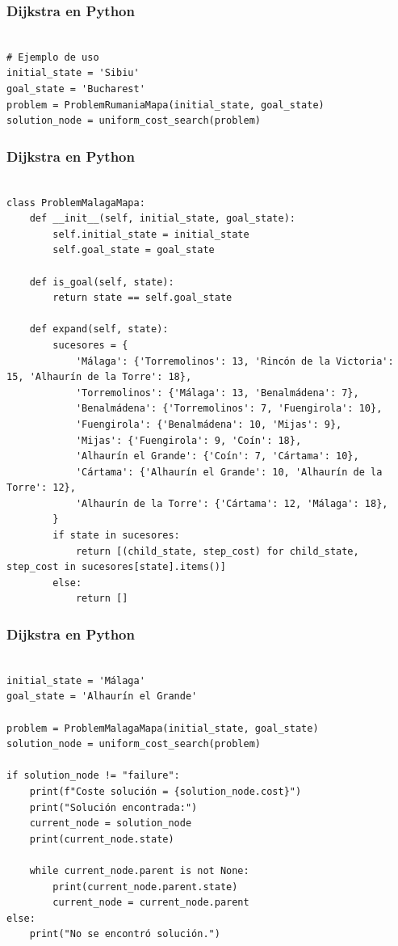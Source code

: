 \documentclass[xcolor=table]{beamer}
\begin{document}
\begin{frame} [fragile ]\frametitle{Dijkstra  en Python } \footnotesize
\begin{verbatim}

# Ejemplo de uso
initial_state = 'Sibiu'
goal_state = 'Bucharest'
problem = ProblemRumaniaMapa(initial_state, goal_state)
solution_node = uniform_cost_search(problem)

\end{verbatim}

\end{frame} 


\begin{frame} [fragile ]\frametitle{Dijkstra  en Python } \footnotesize
\begin{verbatim}

class ProblemMalagaMapa:
    def __init__(self, initial_state, goal_state):
        self.initial_state = initial_state
        self.goal_state = goal_state

    def is_goal(self, state):
        return state == self.goal_state

    def expand(self, state):
        sucesores = {
            'Málaga': {'Torremolinos': 13, 'Rincón de la Victoria': 15, 'Alhaurín de la Torre': 18},
            'Torremolinos': {'Málaga': 13, 'Benalmádena': 7},
            'Benalmádena': {'Torremolinos': 7, 'Fuengirola': 10},
            'Fuengirola': {'Benalmádena': 10, 'Mijas': 9},
            'Mijas': {'Fuengirola': 9, 'Coín': 18},
            'Alhaurín el Grande': {'Coín': 7, 'Cártama': 10},
            'Cártama': {'Alhaurín el Grande': 10, 'Alhaurín de la Torre': 12},
            'Alhaurín de la Torre': {'Cártama': 12, 'Málaga': 18},
        }
        if state in sucesores:
            return [(child_state, step_cost) for child_state, step_cost in sucesores[state].items()]
        else:
            return []
\end{verbatim}

\end{frame} 

\begin{frame} [fragile ]\frametitle{Dijkstra  en Python } \footnotesize
\begin{verbatim}

initial_state = 'Málaga'
goal_state = 'Alhaurín el Grande'

problem = ProblemMalagaMapa(initial_state, goal_state)
solution_node = uniform_cost_search(problem)

if solution_node != "failure":
    print(f"Coste solución = {solution_node.cost}")    
    print("Solución encontrada:")
    current_node = solution_node
    print(current_node.state)
    
    while current_node.parent is not None:
        print(current_node.parent.state)
        current_node = current_node.parent
else:
    print("No se encontró solución.")

\end{verbatim}

\end{frame} 
\end{document}
